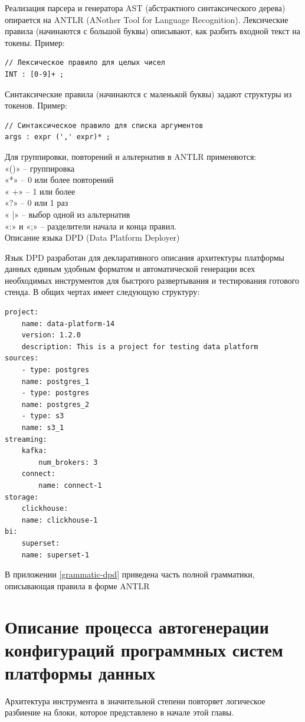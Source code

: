 Реализация парсера и генератора AST (абстрактного синтаксического дерева) опирается на ANTLR (ANother Tool for Language Recognition)\cite{antlr_lab}.
Лексические правила (начинаются с большой буквы) описывают, как разбить входной текст на токены.
Пример:\\
\begin{verbatim}
// Лексическое правило для целых чисел
INT : [0-9]+ ; 
\end{verbatim}
Синтаксические правила (начинаются с маленькой буквы) задают структуры из токенов.
Пример:
\begin{verbatim}
// Синтаксическое правило для списка аргументов
args : expr (',' expr)* ; 
\end{verbatim}
Для группировки, повторений и альтернатив в ANTLR применяются:\\
«()» – группировка\\
«*» – 0 или более повторений\\
« +» – 1 или более\\
«?» – 0 или 1 раз\\
« |» – выбор одной из альтернатив\\
«:» и «;» – разделители начала и конца правил.\\

Описание языка DPD (Data Platform Deployer)

Язык DPD  разработан для  декларативного описания архитектуры платформы данных единым удобным форматом и автоматической генерации всех необходимых инструментов для быстрого развертывания и тестирования готового стенда. В общих чертах имеет следующую структуру:
\begin{verbatim}
project:
    name: data-platform-14
    version: 1.2.0
    description: This is a project for testing data platform
sources:
    - type: postgres
    name: postgres_1
    - type: postgres
    name: postgres_2
    - type: s3
    name: s3_1
streaming:
    kafka:
        num_brokers: 3
    connect:
        name: connect-1
storage:
    clickhouse:
    name: clickhouse-1
bi:
    superset:
    name: superset-1
\end{verbatim}
В приложении \ref{grammatic-dpd}  приведена часть полной грамматики, описывающая правила в форме ANTLR \\





\section{Описание процесса автогенерации конфигураций программных систем платформы данных} \label{ch3:process_generation}
Архитектура инструмента в значительной степени повторяет логическое разбиение на блоки, которое представлено в начале этой главы.

